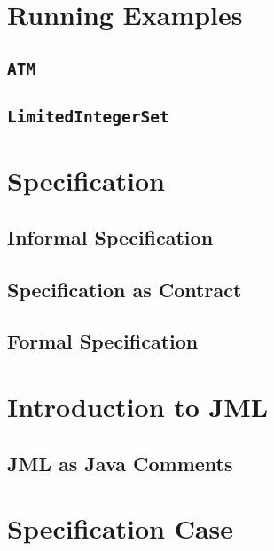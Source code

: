 \documentclass[a4paper, 11pt, accentcolor = tud3b]{tudreport}
\begin{document}
		\section{Running Examples} %

			\subsection{\texttt{ATM}} %

			\subsection{\texttt{LimitedIntegerSet}} %

		\section{Specification} %

			\subsection{Informal Specification} %

			\subsection{Specification as Contract} %

			\subsection{Formal Specification} %

		\section{Introduction to JML} %

			\subsection{JML as Java Comments} %

		\section{Specification Case} %
\end{document}
